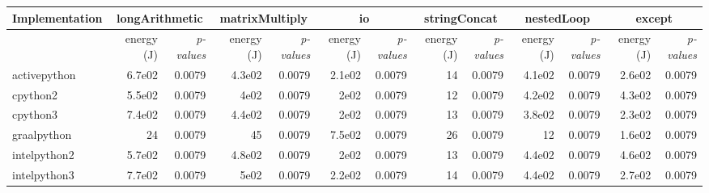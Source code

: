 \begin{table*}
{\begin{tabular}{l|rr|rr|rr|rr|rr|rr}
            Implementation & \multicolumn{2}{c}{longArithmetic} & \multicolumn{2}{c}{matrixMultiply} & \multicolumn{2}{c}{io} & \multicolumn{2}{c}{stringConcat} & \multicolumn{2}{c}{nestedLoop} & \multicolumn{2}{c}{except}                                                                                     \\
            \midrule
                           & energy (J)                         & \em p-values                       & energy (J)             & \em p-values                     & energy (J)                     & \em p-values               & energy (J) & \em p-values & energy (J) & \em p-values & energy (J) & \em p-values \\
            activepython   & 6.7e02                             & 0.0079                             & 4.3e02                 & 0.0079                           & 2.1e02                         & 0.0079                     & 14         & 0.0079       & 4.1e02     & 0.0079       & 2.6e02     & 0.0079       \\
            cpython2       & 5.5e02                             & 0.0079                             & 4e02                   & 0.0079                           & 2e02                           & 0.0079                     & 12         & 0.0079       & 4.2e02     & 0.0079       & 4.3e02     & 0.0079       \\
            cpython3       & 7.4e02                             & 0.0079                             & 4.4e02                 & 0.0079                           & 2e02                           & 0.0079                     & 13         & 0.0079       & 3.8e02     & 0.0079       & 2.3e02     & 0.0079       \\
            graalpython    & 24                                 & 0.0079                             & 45                     & 0.0079                           & 7.5e02                         & 0.0079                     & 26         & 0.0079       & 12         & 0.0079       & 1.6e02     & 0.0079       \\
            intelpython2   & 5.7e02                             & 0.0079                             & 4.8e02                 & 0.0079                           & 2e02                           & 0.0079                     & 13         & 0.0079       & 4.4e02     & 0.0079       & 4.6e02     & 0.0079       \\
            intelpython3   & 7.7e02                             & 0.0079                             & 5e02                   & 0.0079                           & 2.2e02                         & 0.0079                     & 14         & 0.0079       & 4.4e02     & 0.0079       & 2.7e02     & 0.0079       \\

\end{tabular}}
\end{table*}
